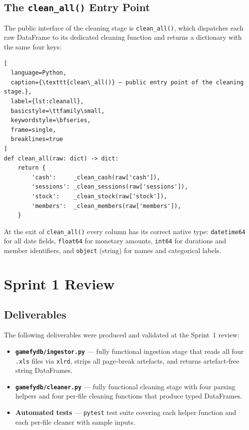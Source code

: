 \subsection{The \texttt{clean\_all()} Entry Point}

The public interface of the cleaning stage is \texttt{clean\_all()}, which
dispatches each raw DataFrame to its dedicated cleaning function and returns a
dictionary with the same four keys:

\begin{lstlisting}[
  language=Python,
  caption={\texttt{clean\_all()} — public entry point of the cleaning stage.},
  label={lst:cleanall},
  basicstyle=\ttfamily\small,
  keywordstyle=\bfseries,
  frame=single,
  breaklines=true
]
def clean_all(raw: dict) -> dict:
    return {
        'cash':     _clean_cash(raw['cash']),
        'sessions': _clean_sessions(raw['sessions']),
        'stock':    _clean_stock(raw['stock']),
        'members':  _clean_members(raw['members']),
    }
\end{lstlisting}

At the exit of \texttt{clean\_all()} every column has its correct native type:
\texttt{datetime64} for all date fields, \texttt{float64} for monetary amounts,
\texttt{int64} for durations and member identifiers, and \texttt{object} (string)
for names and categorical labels.

\section{Sprint 1 Review}

\subsection{Deliverables}

The following deliverables were produced and validated at the Sprint~1 review:

\begin{itemize}
  \item \textbf{\texttt{gamefydb/ingestor.py}} — fully functional ingestion stage
        that reads all four \texttt{.xls} files via \texttt{xlrd}, strips all
        page-break artefacts, and returns artefact-free string DataFrames.
  \item \textbf{\texttt{gamefydb/cleaner.py}} — fully functional cleaning stage
        with four parsing helpers and four per-file cleaning functions that produce
        typed DataFrames.
  \item \textbf{Automated tests} — \texttt{pytest} test suite covering each helper
        function and each per-file cleaner with sample inputs.
\end{itemize}

